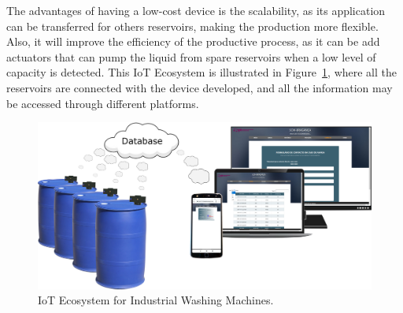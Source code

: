 The advantages of having a low-cost device is the scalability, as its application can be transferred for others reservoirs, making the production more flexible. Also, it will improve the efficiency of the productive process, as it can be add actuators that can pump the liquid from spare reservoirs when a low level of capacity is detected. This \gls{IoT} Ecosystem is illustrated in Figure~\ref{fig:final}, where all the reservoirs are connected with the device developed, and all the information may be accessed through different platforms.

\begin{figure}[h!]
    \centering
    \includegraphics[scale=0.13]{images/Results/modeloFinal.png}
    \caption{IoT Ecosystem for Industrial Washing Machines.}
    \label{fig:final}
\end{figure}